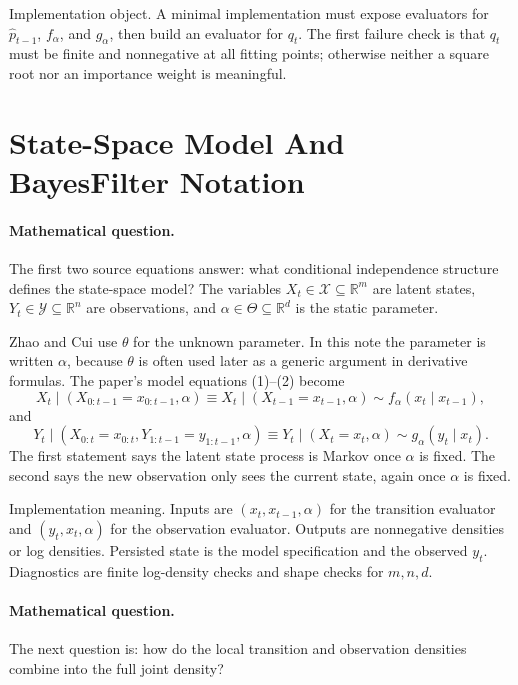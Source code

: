 \documentclass[11pt]{article}
\newcommand{\R}{\mathbb R}
\begin{document}
Implementation object.  A minimal implementation must expose evaluators for
\(\widehat p_{t-1}\), \(f_\alpha\), and \(g_\alpha\), then build an evaluator
for \(q_t\).  The first failure check is that \(q_t\) must be finite and
nonnegative at all fitting points; otherwise neither a square root nor an
importance weight is meaningful.

\section{State-Space Model And BayesFilter Notation}

\paragraph{Mathematical question.}
The first two source equations answer: what conditional independence structure
defines the state-space model?  The variables \(X_t\in\mathcal X\subseteq\R^m\)
are latent states, \(Y_t\in\mathcal Y\subseteq\R^n\) are observations, and
\(\alpha\in\Theta\subseteq\R^d\) is the static parameter.

Zhao and Cui \cite{zhao2024ttsequential} use \(\theta\) for the unknown parameter.  In this note the parameter
is written \(\alpha\), because \(\theta\) is often used later as a generic
argument in derivative formulas.  The paper's model equations (1)--(2) become
\[
    X_t\mid (X_{0:t-1}=x_{0:t-1},\alpha)
    \equiv
    X_t\mid (X_{t-1}=x_{t-1},\alpha)
    \sim f_\alpha(x_t\mid x_{t-1}),
    \label{eq:p24-bf-1}
\]
and
\[
    Y_t\mid (X_{0:t}=x_{0:t},Y_{1:t-1}=y_{1:t-1},\alpha)
    \equiv
    Y_t\mid (X_t=x_t,\alpha)
    \sim g_\alpha(y_t\mid x_t).
    \label{eq:p24-bf-2}
\]
The first statement says the latent state process is Markov once \(\alpha\) is
fixed.  The second says the new observation only sees the current state, again
once \(\alpha\) is fixed.

Implementation meaning. Inputs are \((x_t,x_{t-1},\alpha)\)
for the transition evaluator and \((y_t,x_t,\alpha)\) for the observation
evaluator.  Outputs are nonnegative densities or log densities.  Persisted
state is the model specification and the observed \(y_t\).  Diagnostics are
finite log-density checks and shape checks for \(m,n,d\).

\paragraph{Mathematical question.}
The next question is: how do the local transition and observation densities
combine into the full joint density?
\end{document}
